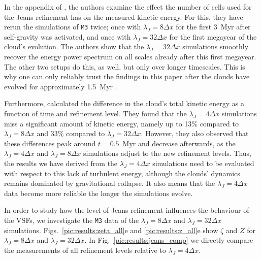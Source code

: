 In the appendix of , the authors examine the effect the number of cells used for the Jeans refinement has on the measured kinetic energy.
For this, they have rerun the simulations of \texttt{M3} twice; 
once with 
$\lambda_J=8\Delta{}x$ for the first 3~Myr after self-gravity was activated, and once with %
$\lambda_J=32\Delta{}x$ for the first megayear of the cloud's evolution.
The authors show that the $\lambda_J=32\Delta{}x$ simulations smoothly 
    recover 
the energy power spectrum on all scales already after this first megayear.
The other two setups do this, as well,
     but only over longer timescales.
This is why one can only reliably trust the findings in this paper after the clouds have evolved for approximately 1.5~Myr \citep[see also][]{IbanezMejia2017,Seifried2017b}.

Furthermore,  calculated the difference in the cloud's total kinetic energy as a function of time and refinement level.
They found that the $\lambda_J = 4\Delta{}x$ simulations miss a significant amount of kinetic energy, namely up to 13\% compared to $\lambda_J = 8\Delta{}x$ and 33\% compared to $\lambda_J = 32\Delta{}x$.
However, they also observed that these differences peak around $t=0.5$~Myr and decrease afterwards, as the $\lambda_J = 4\Delta{}x$ and $\lambda_J = 8\Delta{}x$ simulations adjust to the new refinement levels.
Thus, the results we have derived from the $\lambda_J = 4\Delta{}x$ simulations need to be evaluated with respect to this lack of turbulent energy, although the clouds' dynamics remains dominated by gravitational collapse.
It also means that the $\lambda_J = 4\Delta{}x$ data become more reliable the longer the simulations evolve.

In order to study  how the level of Jeans refinement influences the behaviour of the VSFs, we investigate the \texttt{M3} data of the $\lambda_J = 8\Delta{}x$ and $\lambda_J = 32\Delta{}x$ simulations.
Figs.~\ref{pic:results:zeta_all}e and \ref{pic:results:z_all}e show $\zeta$ and $Z$ for  $\lambda_J = 8\Delta{}x$ and $\lambda_J = 32\Delta{}x$.
In Fig.~\ref{pic:results:jeans_comp} we directly compare the measurements of all refinement levels relative to $\lambda_J = 4\Delta{}x$.

